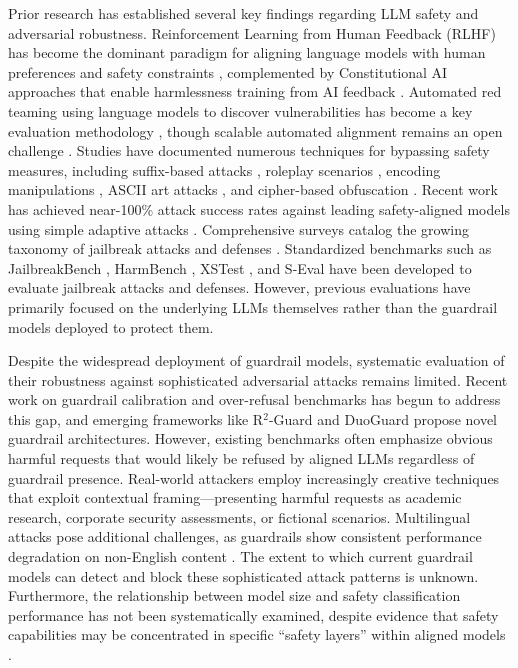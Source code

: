 \documentclass{article}
\begin{document}
Prior research has established several key findings regarding LLM safety and adversarial robustness. Reinforcement Learning from Human Feedback (RLHF) has become the dominant paradigm for aligning language models with human preferences and safety constraints \cite{ouyang2022training}, complemented by Constitutional AI approaches that enable harmlessness training from AI feedback \cite{bai2022constitutional}. Automated red teaming using language models to discover vulnerabilities has become a key evaluation methodology \cite{perez2022red}, though scalable automated alignment remains an open challenge \cite{yi2024scalable_alignment}. Studies have documented numerous techniques for bypassing safety measures, including suffix-based attacks \cite{zou2023universal}, roleplay scenarios \cite{li2024deepinception}, encoding manipulations \cite{wei2023jailbroken}, ASCII art attacks \cite{jiang2024artprompt}, and cipher-based obfuscation \cite{yuan2024gpt4}. Recent work has achieved near-100\% attack success rates against leading safety-aligned models using simple adaptive attacks \cite{andriushchenko2024jailbreaking}. Comprehensive surveys catalog the growing taxonomy of jailbreak attacks and defenses \cite{xu2024jailbreak_survey, chu2024comprehensive}. Standardized benchmarks such as JailbreakBench \cite{chao2024jailbreakbench}, HarmBench \cite{mazeika2024harmbench}, XSTest \cite{rottger2024xstest}, and S-Eval \cite{zeng2024seval} have been developed to evaluate jailbreak attacks and defenses. However, previous evaluations have primarily focused on the underlying LLMs themselves rather than the guardrail models deployed to protect them.

Despite the widespread deployment of guardrail models, systematic evaluation of their robustness against sophisticated adversarial attacks remains limited. Recent work on guardrail calibration \cite{li2024calibration} and over-refusal benchmarks \cite{cui2024orbench} has begun to address this gap, and emerging frameworks like R$^2$-Guard \cite{yuan2024rguard} and DuoGuard \cite{ghosh2024duoguard} propose novel guardrail architectures. However, existing benchmarks often emphasize obvious harmful requests that would likely be refused by aligned LLMs regardless of guardrail presence. Real-world attackers employ increasingly creative techniques that exploit contextual framing---presenting harmful requests as academic research, corporate security assessments, or fictional scenarios. Multilingual attacks pose additional challenges, as guardrails show consistent performance degradation on non-English content \cite{kumar2024multilingual_toxicity, deng2024multilingual_jailbreak}. The extent to which current guardrail models can detect and block these sophisticated attack patterns is unknown. Furthermore, the relationship between model size and safety classification performance has not been systematically examined, despite evidence that safety capabilities may be concentrated in specific ``safety layers'' within aligned models \cite{wei2024safety_layers}.
\end{document}
